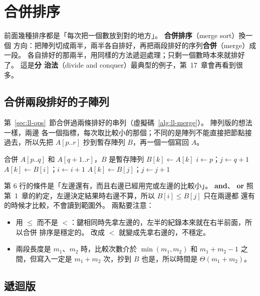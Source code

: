 \section{合併排序}
\label{sec:so-merge}

前面幾種排序都是「每次把一個數放到對的地方」。 \textbf{合併排序}（merge sort）換一個
方向：把陣列切成兩半，兩半各自排好，再把兩段排好的序列\textbf{合併}（merge）成一段。
各自排好的那兩半，用同樣的方法遞迴處理；只剩一個數時本來就排好了。 這是\textbf{分
治法}（divide and conquer）最典型的例子，第~17~章會再看到很多。

\subsection{合併兩段排好的子陣列}

第~\ref{sec:ll-ops}~節合併過兩條排好的串列（虛擬碼~\ref{alg:ll-merge}）。 陣列版的想法一樣，兩邊
各一個指標，每次取比較小的那個；不同的是陣列不能直接把節點接過去，所以先把
$A[p..r]$ 抄到暫存陣列 $B$，再一個一個寫回 $A$。

\begin{pseudo}[label=alg:so-merge]{合併 $A[p..q]$ 和 $A[q+1..r]$，$B$ 是暫存陣列}
        \State $B[k] \gets A[k]$
    \EndFor
    \State $i \gets p$；$j \gets q + 1$
            \State $A[k] \gets B[i]$；$i \gets i + 1$
        \Else
            \State $A[k] \gets B[j]$；$j \gets j + 1$
        \EndIf
    \EndFor
\EndProcedure
\end{pseudo}

第 6 行的條件是「左邊還有，而且右邊已經用完或左邊的比較小」。 \textbf{and}、
\textbf{or} 照第~1~章的約定，左邊決定結果時右邊不算，所以 $B[i] \le B[j]$ 只在兩邊都
還有的時候才比較，不會讀到範圍外。 兩點要注意：

\begin{itemize}
\item 用 $\le$ 而不是 $<$：鍵相同時先拿左邊的，左半的紀錄本來就在右半前面，所以合併
排序是穩定的。 改成 $<$ 就變成先拿右邊的，不穩定。
\item 兩段長度是 $m_1$、$m_2$ 時，比較次數介於 $\min(m_1, m_2)$ 和 $m_1 + m_2 - 1$ 之
間，但寫入一定是 $m_1 + m_2$ 次，抄到 $B$ 也是，所以時間是 $\Theta(m_1 + m_2)$。
\end{itemize}

\subsection{遞迴版}

